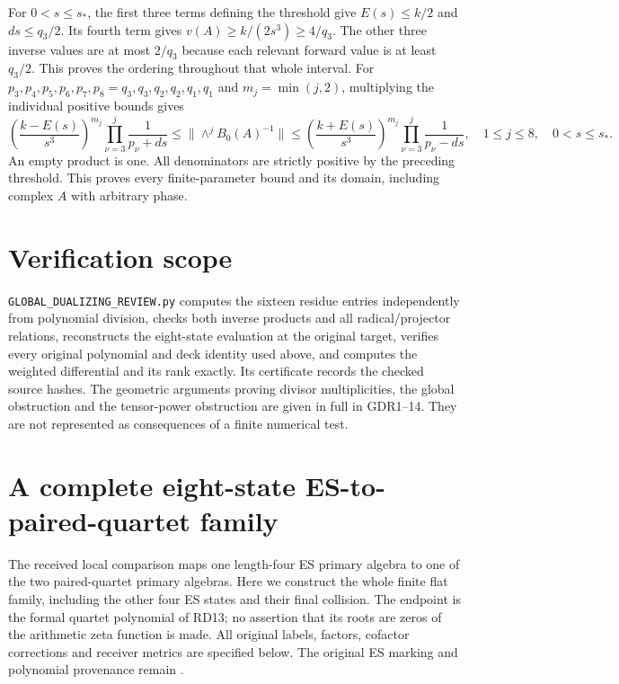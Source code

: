 \documentclass[11pt]{article}
\begin{document}
For $0<s\le s_*$, the first three terms defining the threshold
give $E(s)\le k/2$ and $ds\le q_3/2$. Its fourth term gives
$v(A)\ge k/(2s^3)\ge4/q_3$. The other three inverse values
are at most $2/q_3$ because each relevant forward value is
at least $q_3/2$. This proves the ordering throughout that
whole interval. For $p_3,p_4,p_5,p_6,p_7,p_8=
q_3,q_3,q_2,q_2,q_1,q_1$ and $m_j=\min(j,2)$, multiplying
the individual positive bounds gives
\begin{equation}
 \left(\frac{k-E(s)}{s^3}\right)^{m_j}
 \prod_{\nu=3}^{j}\frac1{p_\nu+ds}
 \le\|\wedge^j B_0(A)^{-1}\|
 \le\left(\frac{k+E(s)}{s^3}\right)^{m_j}
 \prod_{\nu=3}^{j}\frac1{p_\nu-ds},
 \quad 1\le j\le8,\quad 0<s\le s_*.
 \tag{GDR30}
\end{equation}
An empty product is one. All denominators are strictly
positive by the preceding threshold. This proves every
finite-parameter bound and its domain, including complex
$A$ with arbitrary phase.

\section{Verification scope}
\texttt{GLOBAL\_DUALIZING\_REVIEW.py} computes the sixteen
residue entries independently from polynomial division,
checks both inverse products and all radical/projector
relations, reconstructs the eight-state evaluation at the
original target, verifies every original polynomial and deck
identity used above, and computes the weighted differential
and its rank exactly. Its certificate records the checked
source hashes. The geometric arguments proving divisor
multiplicities, the global obstruction and the tensor-power
obstruction are given in full in GDR1--14. They are not
represented as consequences of a finite numerical test.


\section{A complete eight-state ES-to-paired-quartet family}
The received local comparison \cite[Section 5]{ESRHReceived}
maps one length-four ES primary algebra to one of the two
paired-quartet primary algebras. Here we construct the whole
finite flat family, including the other four ES states and
their final collision. The endpoint is the formal quartet
polynomial of RD13; no assertion that its roots are zeros
of the arithmetic zeta function is made. All original
labels, factors, cofactor corrections and receiver metrics
are specified below. The original ES marking and polynomial
provenance remain \cite{ES488,Tao}.
\end{document}
